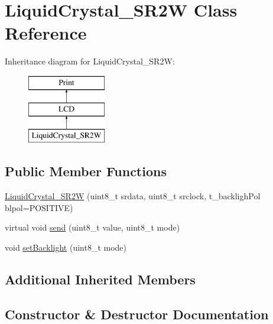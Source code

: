 \hypertarget{class_liquid_crystal___s_r2_w}{}\section{Liquid\+Crystal\+\_\+\+S\+R2\+W Class Reference}
\label{class_liquid_crystal___s_r2_w}
Inheritance diagram for Liquid\+Crystal\+\_\+\+S\+R2\+W\+:\begin{figure}[H]
\begin{center}
\leavevmode
\includegraphics[height=3.000000cm]{class_liquid_crystal___s_r2_w}
\end{center}
\end{figure}
\subsection*{Public Member Functions}
\begin{DoxyCompactItemize}
\item 
\hyperlink{class_liquid_crystal___s_r2_w_af307fdf5c8feb757e965074dcdeb1dd3}{Liquid\+Crystal\+\_\+\+S\+R2\+W} (uint8\+\_\+t srdata, uint8\+\_\+t srclock, t\+\_\+backligh\+Pol blpol=P\+O\+S\+I\+T\+I\+V\+E)
\item 
virtual void \hyperlink{class_liquid_crystal___s_r2_w_a65dc6f261c319be8e56f3c1f6a5c877d}{send} (uint8\+\_\+t value, uint8\+\_\+t mode)
\item 
void \hyperlink{class_liquid_crystal___s_r2_w_a2158db27287c1564a03e7a1472beb3b6}{set\+Backlight} (uint8\+\_\+t mode)
\end{DoxyCompactItemize}
\subsection*{Additional Inherited Members}


\subsection{Constructor \& Destructor Documentation}
\hypertarget{class_liquid_crystal___s_r2_w_af307fdf5c8feb757e965074dcdeb1dd3}{}
